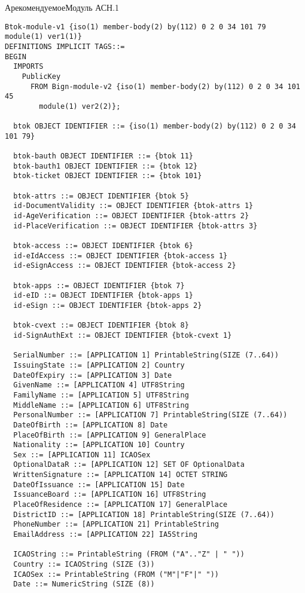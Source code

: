 \begin{appendix}{А}{рекомендуемое}{Модуль АСН.1}


\begin{verbatim}
Btok-module-v1 {iso(1) member-body(2) by(112) 0 2 0 34 101 79 module(1) ver1(1)}
DEFINITIONS IMPLICIT TAGS::=
BEGIN
  IMPORTS 
    PublicKey 
      FROM Bign-module-v2 {iso(1) member-body(2) by(112) 0 2 0 34 101 45 
        module(1) ver2(2)};

  btok OBJECT IDENTIFIER ::= {iso(1) member-body(2) by(112) 0 2 0 34 101 79}

  btok-bauth OBJECT IDENTIFIER ::= {btok 11}
  btok-bauth1 OBJECT IDENTIFIER ::= {btok 12}
  btok-ticket OBJECT IDENTIFIER ::= {btok 101}

  btok-attrs ::= OBJECT IDENTIFIER {btok 5}
  id-DocumentValidity ::= OBJECT IDENTIFIER {btok-attrs 1}
  id-AgeVerification ::= OBJECT IDENTIFIER {btok-attrs 2}
  id-PlaceVerification ::= OBJECT IDENTIFIER {btok-attrs 3}

  btok-access ::= OBJECT IDENTIFIER {btok 6}
  id-eIdAccess ::= OBJECT IDENTIFIER {btok-access 1}
  id-eSignAccess ::= OBJECT IDENTIFIER {btok-access 2}

  btok-apps ::= OBJECT IDENTIFIER {btok 7}
  id-eID ::= OBJECT IDENTIFIER {btok-apps 1}
  id-eSign ::= OBJECT IDENTIFIER {btok-apps 2}

  btok-cvext ::= OBJECT IDENTIFIER {btok 8}
  id-SignAuthExt ::= OBJECT IDENTIFIER {btok-cvext 1}

  SerialNumber ::= [APPLICATION 1] PrintableString(SIZE (7..64))
  IssuingState ::= [APPLICATION 2] Country
  DateOfExpiry ::= [APPLICATION 3] Date
  GivenName ::= [APPLICATION 4] UTF8String
  FamilyName ::= [APPLICATION 5] UTF8String
  MiddleName ::= [APPLICATION 6] UTF8String
  PersonalNumber ::= [APPLICATION 7] PrintableString(SIZE (7..64))
  DateOfBirth ::= [APPLICATION 8] Date
  PlaceOfBirth ::= [APPLICATION 9] GeneralPlace
  Nationality ::= [APPLICATION 10] Country
  Sex ::= [APPLICATION 11] ICAOSex
  OptionalDataR ::= [APPLICATION 12] SET OF OptionalData
  WrittenSignature ::= [APPLICATION 14] OCTET STRING
  DateOfIssuance ::= [APPLICATION 15] Date
  IssuanceBoard ::= [APPLICATION 16] UTF8String
  PlaceOfResidence ::= [APPLICATION 17] GeneralPlace
  DistrictID ::= [APPLICATION 18] PrintableString(SIZE (7..64))
  PhoneNumber ::= [APPLICATION 21] PrintableString
  EmailAddress ::= [APPLICATION 22] IA5String
  
  ICAOString ::= PrintableString (FROM ("A".."Z" | " "))
  Country ::= ICAOString (SIZE (3))
  ICAOSex ::= PrintableString (FROM ("M"|"F"|" "))
  Date ::= NumericString (SIZE (8))
  

\end{verbatim}
\end{appendix}
